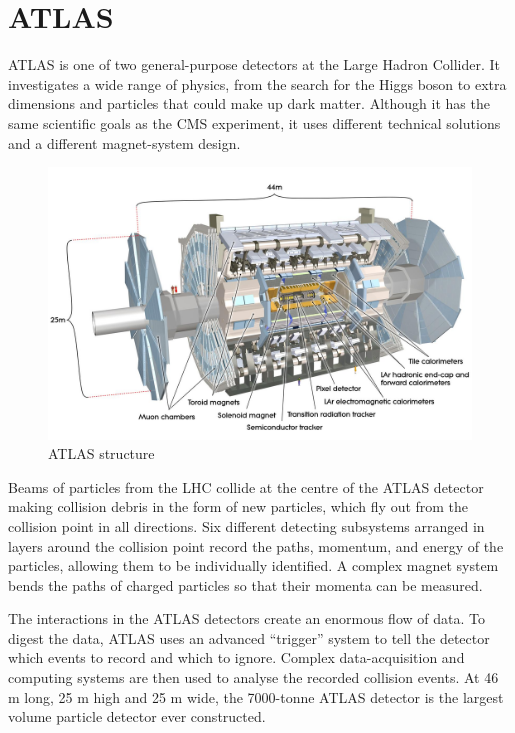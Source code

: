 \documentclass[a4paper, oneside]{book}
\begin{document}
		\section{ATLAS}	
			ATLAS \cite{ATLAS config} is one of two general-purpose detectors at the Large Hadron Collider. It investigates a wide range of physics, from the search for the Higgs boson to extra dimensions and particles that could make up dark matter. Although it has the same scientific goals as the CMS experiment, it uses different technical solutions and a different magnet-system design.
			\begin{figure}[H]
				\centering
				\includegraphics[width=0.6\textheight]{tesi_images/atlas_structure.jpg}
				\caption{ATLAS structure}
				\label{fig:ATLAS structure}
			\end{figure}
		
			Beams of particles from the LHC collide at the centre of the ATLAS detector making collision debris in the form of new particles, which fly out from the collision point in all directions. Six different detecting subsystems arranged in layers around the collision point record the paths, momentum, and energy of the particles, allowing them to be individually identified. A complex magnet system bends the paths of charged particles so that their momenta can be measured.
		
			The interactions in the ATLAS detectors create an enormous flow of data. To digest the data, ATLAS uses an advanced “trigger” system to tell the detector which events to record and which to ignore. Complex data-acquisition and computing systems are then used to analyse the recorded collision events. At 46 m long, 25 m high and 25 m wide, the 7000-tonne ATLAS detector is the largest volume particle detector ever constructed. 
\end{document}
